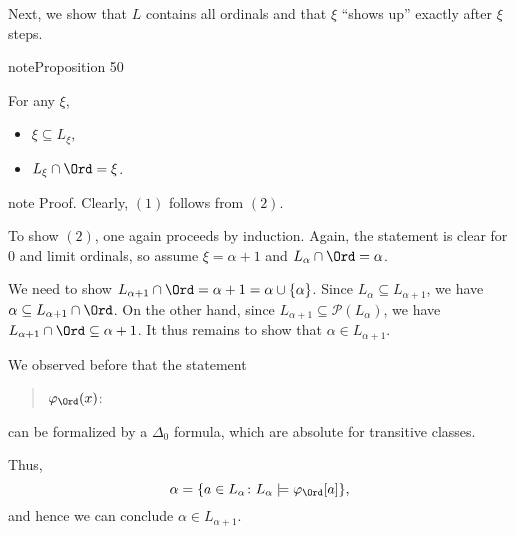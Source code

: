 \documentclass[letterpaper,10pt,english]{jupyterBook}
\begin{document}
\sphinxAtStartPar
Next, we show that \(L\) contains all ordinals and that \(\xi\) “shows up” exactly after \(\xi\) steps.
\label{constructible:proposition-1}
\begin{sphinxadmonition}{note}{Proposition 50}



\sphinxAtStartPar
For any \(\xi\),
\begin{itemize}
\item {} 
\sphinxAtStartPar
{} \(\xi \subseteq L_\xi\),

\item {} 
\sphinxAtStartPar
{} \(L_\xi \cap \Ord = \xi\).

\end{itemize}
\end{sphinxadmonition}

\begin{sphinxadmonition}{note}
\sphinxAtStartPar
Proof. Clearly, \((1)\) follows from \((2)\).

\sphinxAtStartPar
To show \((2)\), one again proceeds by induction. Again, the statement is clear for \(0\) and limit ordinals, so assume \(\xi = \alpha +1\) and \(L_\alpha \cap \Ord = \alpha\).

\sphinxAtStartPar
We need to show \(L_{\alpha + 1} \cap \Ord = \alpha + 1 = \alpha \cup \{\alpha\}\). Since \(L_\alpha \subseteq L_{\alpha + 1}\), we have \(\alpha \subseteq L_{\alpha+1} \cap \Ord\). On the other hand, since \(L_{\alpha+1} \subseteq \mathcal{P}(L_\alpha)\), we have \(L_{\alpha+1} \cap \Ord \subseteq \alpha + 1\). It thus remains to show that \(\alpha \in L_{\alpha+1}\).

\sphinxAtStartPar
We observed before that the statement
\begin{quote}

\sphinxAtStartPar
\(\varphi_{\Ord}(x)\): 
\end{quote}

\sphinxAtStartPar
can be formalized by a \(\Delta_0\) formula, which are absolute for transitive classes.

\sphinxAtStartPar
Thus,
\begin{equation*}
	\alpha = \{ a \in L_\alpha \colon L_\alpha \models \varphi_{\Ord}[a] \},
\end{equation*}
\sphinxAtStartPar
and hence we can conclude \(\alpha \in L_{\alpha+1}\).
\end{sphinxadmonition}
\end{document}
